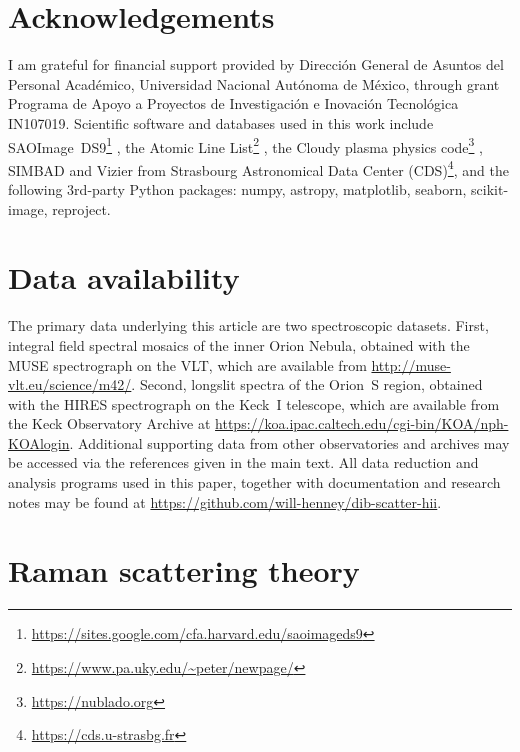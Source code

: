 \documentclass[useAMS, usenatbib, a4paper]{mnras}
\begin{document}
\section*{Acknowledgements}
I am grateful for financial support provided by
\foreignlanguage{spanish}{
  Dirección General de Asuntos del Personal Académico,
  Universidad Nacional Autónoma de México},
through grant
\foreignlanguage{spanish}{
  Programa de Apoyo a Proyectos de Investigación
  e Inovación Tecnológica}
IN107019.
Scientific software and databases used in this work include
SAOImage~DS9\footnote{\url{https://sites.google.com/cfa.harvard.edu/saoimageds9}} \citep{Joye:2003a},
the Atomic Line List\footnote{\url{https://www.pa.uky.edu/~peter/newpage/}} \citep{Van-Hoof:2018a},
the Cloudy plasma physics code\footnote{\url{https://nublado.org}}
\citep{Ferland:2017a},
SIMBAD and Vizier from Strasbourg Astronomical Data Center (CDS)\footnote{\url{https://cds.u-strasbg.fr}},
and the following 3rd-party Python packages:
numpy, astropy, matplotlib, seaborn, scikit-image, reproject.


\section*{Data availability}
\label{sec:data-availability}

The primary data underlying this article are two spectroscopic datasets.
First, integral field spectral mosaics of the inner Orion Nebula,
obtained with the MUSE spectrograph on the VLT,
which are available from \url{http://muse-vlt.eu/science/m42/}.
Second, longslit spectra of the Orion~S region,
obtained with the HIRES spectrograph on the Keck~I telescope,
which are available from the Keck Observatory Archive at
\url{https://koa.ipac.caltech.edu/cgi-bin/KOA/nph-KOAlogin}.
Additional supporting data from other observatories and archives
may be accessed via the references given in the main text.
All data reduction and analysis programs used in this paper,
together with documentation and research notes may be found at
\url{https://github.com/will-henney/dib-scatter-hii}.



\appendix

\section{Raman scattering theory}
\label{sec:raman-theory}
\end{document}
